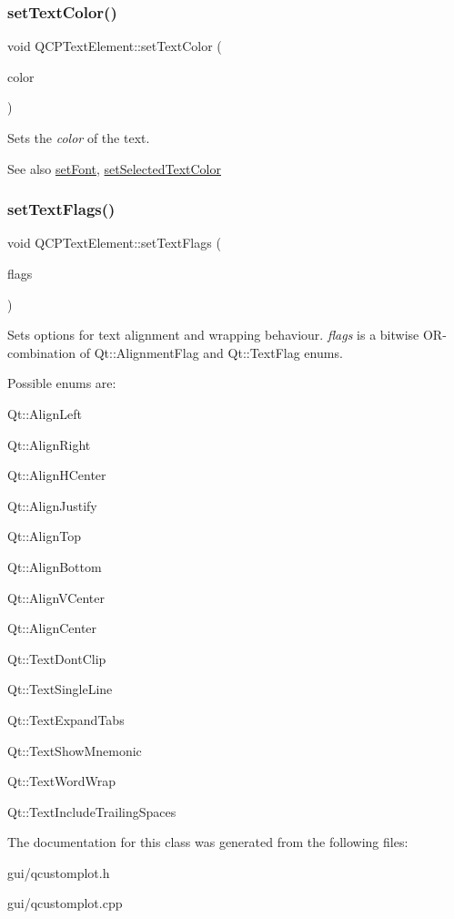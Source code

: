\subsubsection{\texorpdfstring{set\+Text\+Color()}{setTextColor()}}
{\footnotesize\ttfamily void Q\+C\+P\+Text\+Element\+::set\+Text\+Color (\begin{DoxyParamCaption}\item[{const Q\+Color \&}]{color }\end{DoxyParamCaption})}

Sets the {\itshape color} of the text.

\begin{DoxySeeAlso}{See also}
\hyperlink{classQCPTextElement_a09b3241769528fa87cb4bf35c97defad}{set\+Font}, \hyperlink{classQCPTextElement_abaec200cae70a0eade53583defc0476d}{set\+Selected\+Text\+Color} 
\end{DoxySeeAlso}
\mbox{\label{classQCPTextElement_ab908f437f552020888a3ad8cf8242605}} 
\subsubsection{\texorpdfstring{set\+Text\+Flags()}{setTextFlags()}}
{\footnotesize\ttfamily void Q\+C\+P\+Text\+Element\+::set\+Text\+Flags (\begin{DoxyParamCaption}\item[{int}]{flags }\end{DoxyParamCaption})}

Sets options for text alignment and wrapping behaviour. {\itshape flags} is a bitwise O\+R-\/combination of {\ttfamily Qt\+::\+Alignment\+Flag} and {\ttfamily Qt\+::\+Text\+Flag} enums.

Possible enums are\+:
\begin{DoxyItemize}
\item Qt\+::\+Align\+Left
\item Qt\+::\+Align\+Right
\item Qt\+::\+Align\+H\+Center
\item Qt\+::\+Align\+Justify
\item Qt\+::\+Align\+Top
\item Qt\+::\+Align\+Bottom
\item Qt\+::\+Align\+V\+Center
\item Qt\+::\+Align\+Center
\item Qt\+::\+Text\+Dont\+Clip
\item Qt\+::\+Text\+Single\+Line
\item Qt\+::\+Text\+Expand\+Tabs
\item Qt\+::\+Text\+Show\+Mnemonic
\item Qt\+::\+Text\+Word\+Wrap
\item Qt\+::\+Text\+Include\+Trailing\+Spaces 
\end{DoxyItemize}

The documentation for this class was generated from the following files\+:\begin{DoxyCompactItemize}
\item 
gui/qcustomplot.\+h\item 
gui/qcustomplot.\+cpp\end{DoxyCompactItemize}
